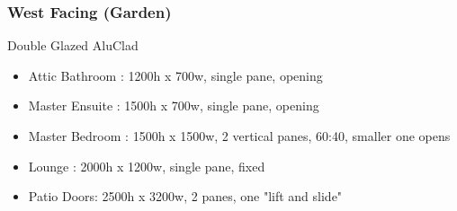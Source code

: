 \subsubsection{West Facing (Garden)}
Double Glazed AluClad
\begin{itemize}
\item Attic Bathroom : 1200h x 700w, single pane, opening
\item Master Ensuite : 1500h x 700w, single pane, opening
\item Master Bedroom : 1500h x 1500w, 2 vertical panes, 60:40, smaller one opens
\item Lounge : 2000h x 1200w, single pane, fixed
\item Patio Doors: 2500h x 3200w, 2 panes, one "lift and slide"
\end{itemize}

